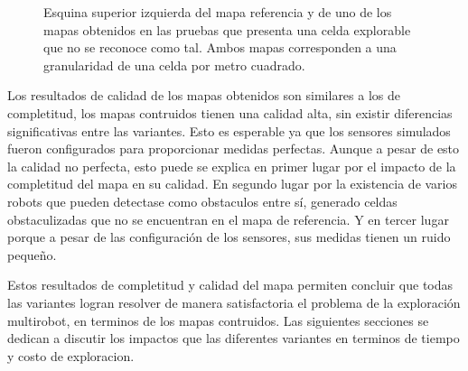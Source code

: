 \begin{figure}[H]
  \centerfloat

  \qquad

  \caption{Esquina superior izquierda del mapa referencia y de uno de los mapas
  obtenidos en las pruebas que presenta una celda explorable que no se reconoce
como tal. Ambos mapas corresponden a una granularidad de una celda por metro cuadrado.}\label{fig:faltaCub}

\end{figure}

Los resultados de calidad de los mapas obtenidos son similares a los de
completitud, los mapas contruidos tienen una calidad alta, sin existir
diferencias significativas entre las variantes. Esto es esperable ya que
los sensores simulados fueron configurados para proporcionar medidas perfectas.
Aunque a pesar de esto la calidad no perfecta, esto puede se explica en primer
lugar por el impacto de la completitud del mapa en su calidad. En segundo lugar
por la existencia de varios robots que pueden detectase como obstaculos entre
sí, generado celdas obstaculizadas que no se encuentran en el mapa de
referencia. Y en tercer lugar porque a pesar de las configuración de los
sensores, sus medidas tienen un ruido pequeño.

Estos resultados de completitud y calidad del mapa permiten concluir que todas
las variantes logran resolver de manera satisfactoria el problema de la
exploración multirobot, en terminos de los mapas contruidos. Las
siguientes secciones se dedican a discutir los impactos que las diferentes
variantes en terminos de tiempo y costo de exploracion.

